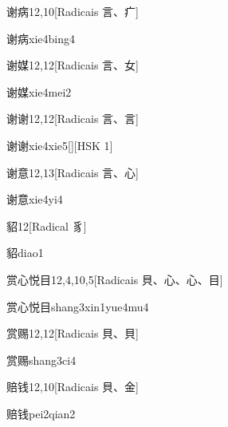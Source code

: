 \begin{entry}{谢病}{12,10}[Radicais ⾔、⽧]
  \begin{phonetics}{谢病}{xie4bing4}
  \end{phonetics}
\end{entry}

\begin{entry}{谢媒}{12,12}[Radicais ⾔、⼥]
  \begin{phonetics}{谢媒}{xie4mei2}
  \end{phonetics}
\end{entry}

\begin{entry}{谢谢}{12,12}[Radicais ⾔、⾔]
  \begin{phonetics}{谢谢}{xie4xie5}[][HSK 1]
  \end{phonetics}
\end{entry}

\begin{entry}{谢意}{12,13}[Radicais ⾔、⼼]
  \begin{phonetics}{谢意}{xie4yi4}
  \end{phonetics}
\end{entry}

\begin{entry}{貂}{12}[Radical ⾘]
  \begin{phonetics}{貂}{diao1}
  \end{phonetics}
\end{entry}

\begin{entry}{赏心悦目}{12,4,10,5}[Radicais ⾙、⼼、⼼、⽬]
  \begin{phonetics}{赏心悦目}{shang3xin1yue4mu4}
  \end{phonetics}
\end{entry}

\begin{entry}{赏赐}{12,12}[Radicais ⾙、⾙]
  \begin{phonetics}{赏赐}{shang3ci4}
  \end{phonetics}
\end{entry}

\begin{entry}{赔钱}{12,10}[Radicais ⾙、⾦]
  \begin{phonetics}{赔钱}{pei2qian2}
  \end{phonetics}
\end{entry}

